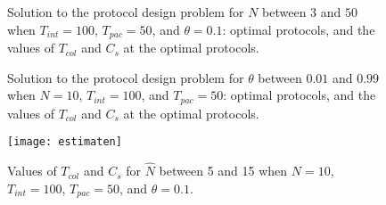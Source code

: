 \documentclass[12pt,draftclsnofoot,onecolumn]{IEEEtran}
\begin{document}
\begin{figure}\centering
{}\caption{Solution to the protocol design problem
for $N$ between $3$ and $50$ when $T_{int} = 100$, $T_{pac} = 50$, and $\theta = 0.1$:
\protect{} optimal protocols, and
\protect{} the values of $T_{col}$ and $C_s$ at the optimal protocols.}
\label{fig:nunc}\end{figure}

\begin{figure}\centering
{}\caption{Solution to the protocol design problem
for $\theta$ between $0.01$ and $0.99$ when $N = 10$, $T_{int} = 100$, and $T_{pac} = 50$:
\protect{} optimal protocols, and
\protect{} the values of $T_{col}$ and $C_s$ at the optimal protocols.}
\label{fig:tunc}\end{figure}

\begin{figure}\centering
\texttt{[image: estimaten]}
\caption{Values of $T_{col}$ and $C_s$
for $\hat{N}$ between 5 and 15
when $N = 10$, $T_{int} = 100$, $T_{pac} = 50$, and $\theta = 0.1$.}
\label{fig:esti}\end{figure}
\end{document}
